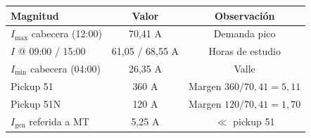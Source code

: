 \begin{tabular}{lcc}
\toprule
\textbf{Magnitud} & \textbf{Valor} & \textbf{Observación} \\
\midrule
$I_{\max}$ cabecera (12:00) & 70,41 A & Demanda pico \\
$I$ @ 09:00 / 15:00 & 61,05 / 68,55 A & Horas de estudio \\
$I_{\min}$ cabecera (04:00) & 26,35 A & Valle \\
Pickup 51 & 360 A & Margen $360/70{,}41 = 5,11$ \\
Pickup 51N & 120 A & Margen $120/70{,}41 = 1,70$ \\
$I_{\mathrm{gen}}$ referida a MT & 5,25 A & $\ll$ pickup 51 \\
\bottomrule
\end{tabular}
